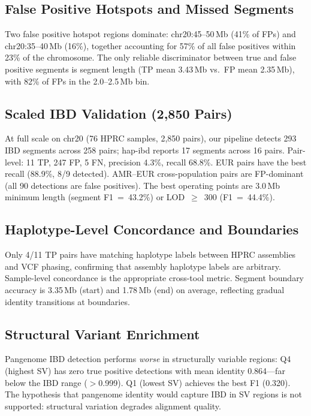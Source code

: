 \documentclass[11pt]{article}
\begin{document}
\subsection{False Positive Hotspots and Missed Segments}
\label{sec:supp_fp_analysis}

Two false positive hotspot regions dominate: chr20:45--50\,Mb (41\% of FPs) and chr20:35--40\,Mb (16\%), together accounting for 57\% of all false positives within 23\% of the chromosome. The only reliable discriminator between true and false positive segments is segment length (TP mean 3.43\,Mb vs.\ FP mean 2.35\,Mb), with 82\% of FPs in the 2.0--2.5\,Mb bin.

\subsection{Scaled IBD Validation (2,850 Pairs)}
\label{sec:supp_scaled_ibd_summary}

At full scale on chr20 (76 HPRC samples, 2,850 pairs), our pipeline detects 293 IBD segments across 258 pairs; hap-ibd reports 17 segments across 16 pairs. Pair-level: 11 TP, 247 FP, 5 FN, precision 4.3\%, recall 68.8\%. EUR pairs have the best recall (88.9\%, 8/9 detected). AMR--EUR cross-population pairs are FP-dominant (all 90 detections are false positives). The best operating points are 3.0\,Mb minimum length (segment F1~=~43.2\%) or LOD~$\geq$~300 (F1~=~44.4\%).

\subsection{Haplotype-Level Concordance and Boundaries}
\label{sec:supp_haplotype}

Only 4/11 TP pairs have matching haplotype labels between HPRC assemblies and VCF phasing, confirming that assembly haplotype labels are arbitrary. Sample-level concordance is the appropriate cross-tool metric. Segment boundary accuracy is 3.35\,Mb (start) and 1.78\,Mb (end) on average, reflecting gradual identity transitions at boundaries.

\subsection{Structural Variant Enrichment}
\label{sec:supp_sv}

Pangenome IBD detection performs \emph{worse} in structurally variable regions: Q4 (highest SV) has zero true positive detections with mean identity 0.864---far below the IBD range ($>$0.999). Q1 (lowest SV) achieves the best F1 (0.320). The hypothesis that pangenome identity would capture IBD in SV regions is not supported: structural variation degrades alignment quality.
\end{document}
